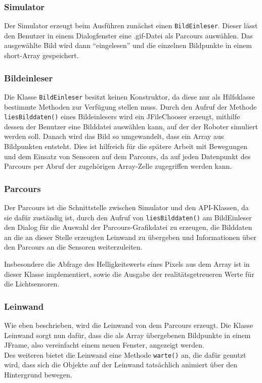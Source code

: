 \documentclass[paper=a4, pagesize, DIV=calc, BCOR=15mm, twoside=on, onecolumn=on, open = right, titlepage =on, parskip =half-, headsepline = on, footsepline = on, chapterprefix = on, appendixprefix = off, fontsize = 12pt, numbers = noenddot, abstract = on]{scrbook}
\numberwithin{equation}{chapter}
\theoremstyle{definition}
\theoremstyle{plain}
\theoremstyle{plain}
\theoremstyle{remark}
\theoremstyle{plain}
\theoremstyle{plain}
\begin{document}
\subsubsection{Simulator}
Der Simulator erzeugt beim Ausführen zunächst einen \texttt{BildEinleser}. Dieser lässt den Benutzer in einem Dialogfenster eine .gif-Datei als Parcours auswählen. Das ausgewählte Bild wird dann "`eingelesen"' und die einzelnen Bildpunkte in einem short-Array gespeichert.

\subsubsection{Bildeinleser}
Die Klasse \texttt{BildEinleser} besitzt keinen Konstruktor, da diese nur als Hilfsklasse bestimmte Methoden zur Verfügung stellen muss. Durch den Aufruf der Methode\\
\texttt{liesBilddaten()} eines Bildeinlesers wird ein JFileChooser erzeugt, mithilfe dessen der Benutzer eine Bilddatei auswählen kann, auf der der Roboter simuliert werden soll. Danach wird das Bild so umgewandelt, dass ein Array aus Bildpunkten entsteht. Dies ist hilfreich für die spätere Arbeit mit Bewegungen und dem Einsatz von Sensoren auf dem Parcours, da auf jeden Datenpunkt des Parcours per Abruf der zugehörigen Array-Zelle zugegriffen werden kann.

\subsubsection{Parcours}
Der Parcours ist die Schnittstelle zwischen Simulator und den API-Klassen, da sie dafür zuständig ist, durch den Aufruf von \texttt{liesBilddaten()} am BildEinleser den Dialog für die Auswahl der Parcours-Grafikdatei zu erzeugen, die Bilddaten an die an dieser Stelle erzeugten Leinwand zu übergeben und Informationen über den Parcours an die Sensoren weiterzuleiten.

Insbesondere die Abfrage des Helligkeitswerts eines Pixels aus dem Array ist in dieser Klasse implementiert, sowie die Ausgabe der realitätsgetreueren Werte für die Lichtsensoren.

\subsubsection{Leinwand}
Wie eben beschrieben, wird die Leinwand von dem Parcours erzeugt. Die Klasse Leinwand sorgt nun dafür, dass die als Array übergebenen Bildpunkte in einem JFrame, also vereinfacht einem neuen Fenster, angezeigt werden. \\
Des weiteren bietet die Leinwand eine Methode \texttt{warte()} an, die dafür genutzt wird, dass sich die Objekte auf der Leinwand tatsächlich animiert über den Hintergrund bewegen.
\end{document}
